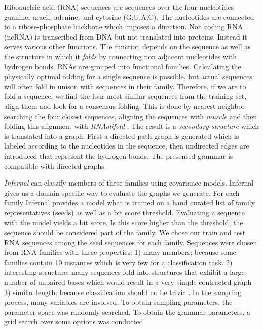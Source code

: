 \documentclass{article}
\begin{document}
Ribonucleic acid (RNA) sequences are sequences over the four nucleotides guanine,
uracil, adenine, and cytosine (G,U,A,C).
The nucleotides are connected to a ribose-phosphate backbone which imposes a
direction. Non coding RNA (ncRNA) is transcribed from DNA but not
translated into proteins. Instead it serves various other functions.
The function depends on the sequence as well as the structure in which it 
\emph{folds} by connecting non adjacent nucleotides with hydrogen bonds. 
RNAs are grouped into functional families\cite{rfam}.
Calculating the physically optimal folding for a single sequence
is possible, but actual sequences will often fold in unison with 
sequences in their family. Therefore, if we are to fold a sequence,
we find the four most similar sequences from the training set, align them  and 
look for a consensus folding.
This is done by nearest neighbor searching the four closest sequences, 
aligning the sequences with \emph{muscle} \cite{muscle}
and then folding this alignment with \emph{RNAalifold}
\cite{rnaalifold}.  
The result is a \emph{secondary structure} which is translated into a 
graph. First a directed path graph is generated which is labeled
according to the nucleotides in the sequence, then undirected edges 
are introduced that represent the hydrogen bonds.
The presented grammar is compatible with directed graphs.

\emph{Infernal}\cite{infernal} can classify members of these families using
covariance models. Infernal gives us a domain specific way to evaluate
the graphs we generate. 
For each family Infernal provides a model what is trained on 
a hand curated list of family representatives (seeds) as well as a 
bit score threshold. Evaluating a sequence with the model yields a bit score.
Is this score higher than the threshold, the sequence should be considered 
part of the family. 
We chose our train and test RNA sequences among the seed sequences for each
family. Sequences were chosen from RNA families with three properties:
1) many members; because some families contain 10
instances which is very few for a classification task. 2)  interesting 
structure; many sequences fold into structures that exhibit a large number of 
unpaired bases which would result in a very simple contracted graph
3) similar length; because classification should no be trivial.
In the sampling process, many variables are involved.
To obtain 
sampling parameters, the parameter space was randomly searched.
To obtain the grammar parameters, a grid search over some options was conducted.
\end{document}
